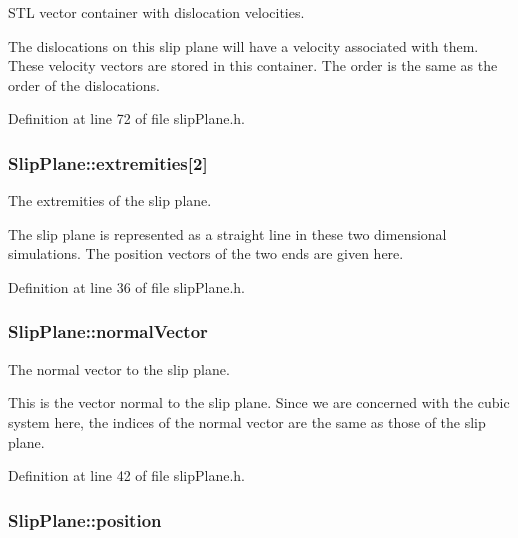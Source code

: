 S\-T\-L vector container with dislocation velocities. 

The dislocations on this slip plane will have a velocity associated with them. These velocity vectors are stored in this container. The order is the same as the order of the dislocations. 

Definition at line 72 of file slip\-Plane.\-h.

\hypertarget{classSlipPlane_a52df6a08ab40ffd0dfb4a467e45d2835}{
\subsubsection[{extremities}]{ Slip\-Plane\-::extremities\mbox{[}2\mbox{]}\hspace{0.3cm}{\ttfamily [protected]}}}\label{db/d25/classSlipPlane_a52df6a08ab40ffd0dfb4a467e45d2835}


The extremities of the slip plane. 

The slip plane is represented as a straight line in these two dimensional simulations. The position vectors of the two ends are given here. 

Definition at line 36 of file slip\-Plane.\-h.

\hypertarget{classSlipPlane_aad33ce7b595e5fc55aefe51c7b0957f2}{
\subsubsection[{normal\-Vector}]{ Slip\-Plane\-::normal\-Vector\hspace{0.3cm}{\ttfamily [protected]}}}\label{db/d25/classSlipPlane_aad33ce7b595e5fc55aefe51c7b0957f2}


The normal vector to the slip plane. 

This is the vector normal to the slip plane. Since we are concerned with the cubic system here, the indices of the normal vector are the same as those of the slip plane. 

Definition at line 42 of file slip\-Plane.\-h.

\hypertarget{classSlipPlane_ac2ac59e22e9638a990c9e45aaa096d9a}{
\subsubsection[{position}]{ Slip\-Plane\-::position\hspace{0.3cm}{\ttfamily [protected]}}}\label{db/d25/classSlipPlane_ac2ac59e22e9638a990c9e45aaa096d9a}


